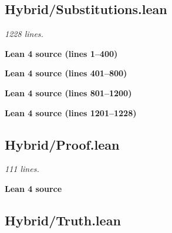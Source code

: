 \documentclass[11pt,a4paper]{article}
\renewcommand{\_}{\origtextunderscore\allowbreak}
\begin{document}
\hypertarget{hybridsubstitutions.lean}{%
\subsection{Hybrid/Substitutions.lean}\label{hybridsubstitutions.lean}}

\emph{1228 lines.}

\noindent\textcolor{green!40!black}{\textbf{Lean 4 source (lines 1--400)}}\par\vspace{0.25\baselineskip}


\noindent\textcolor{green!40!black}{\textbf{Lean 4 source (lines 401--800)}}\par\vspace{0.25\baselineskip}


\noindent\textcolor{green!40!black}{\textbf{Lean 4 source (lines 801--1200)}}\par\vspace{0.25\baselineskip}


\noindent\textcolor{green!40!black}{\textbf{Lean 4 source (lines 1201--1228)}}\par\vspace{0.25\baselineskip}


\hypertarget{hybridproof.lean}{%
\subsection{Hybrid/Proof.lean}\label{hybridproof.lean}}

\emph{111 lines.}

\vspace{0.5\baselineskip}
\noindent\textcolor{green!40!black}{\textbf{Lean 4 source}}\par\vspace{0.25\baselineskip}

\vspace{0.5\baselineskip}

\hypertarget{hybridtruth.lean}{%
\subsection{Hybrid/Truth.lean}\label{hybridtruth.lean}}
\end{document}
